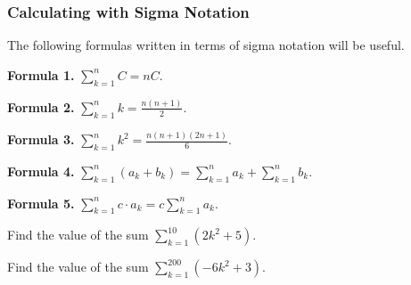 \documentclass[10pt,t,handout,ignorenonframetext,aspectratio=169]{beamer}
\begin{document}
\begin{frame}
  \frametitle{Calculating with Sigma Notation}
  The following formulas written in terms of sigma notation will be useful.

  \begin{description}
  \item \textbf{Formula 1.} $\displaystyle \sum_{k=1}^n C = nC$.
  \item \textbf{Formula 2.} $\displaystyle \sum_{k=1}^n k = \frac{n(n+1)}{2}$.
  \item \textbf{Formula 3.} $\displaystyle \sum_{k=1}^n k^2 = \frac{n(n+1)(2n+1)}{6}$.
  \item \textbf{Formula 4.} $\displaystyle \sum_{k=1}^{n} (a_k + b_k) = \sum_{k=1}^n a_k + \sum_{k=1}^n b_k$.
  \item \textbf{Formula 5.} $\displaystyle \sum_{k=1}^{n} c \cdot a_k = c \sum_{k=1}^n a_k$.
  \end{description}
\end{frame}

\begin{frame}
  \vs
  \begin{question}
    Find the value of the sum
    $\displaystyle \sum_{k=1}^{10} \left(2k^2+5\right)$.
  \end{question}

  \vfill
  \begin{question}
    Find the value of the sum
    $\displaystyle \sum_{k=1}^{200} \left(-6k^2+3\right)$.
  \end{question}
\end{frame}
\end{document}
